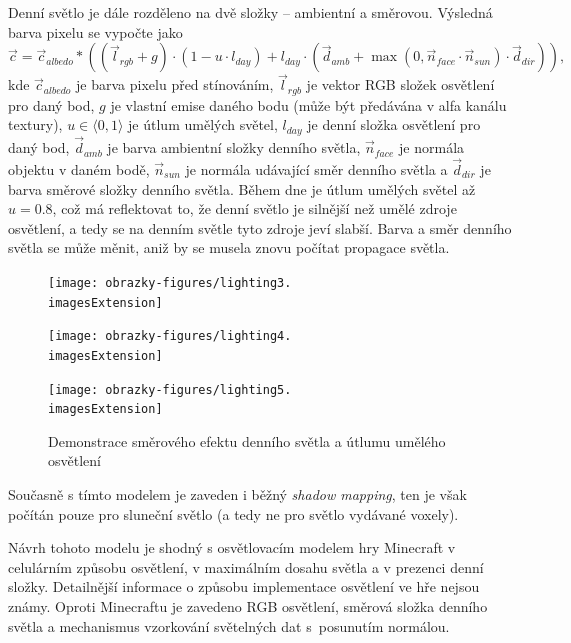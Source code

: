 Denní světlo je dále rozděleno na dvě složky -- ambientní a směrovou. Výsledná barva pixelu se vypočte jako
\begin{equation} \label{lightingEq}
	\vec{c} = \vec{c}_{albedo} * \left((\vec{l}_{rgb} + g) \cdot (1 - u \cdot l_{day}) + l_{day} \cdot \left(\vec{d}_{amb} + \max(0, \vec{n}_{face} \cdot \vec{n}_{sun}) \cdot \vec{d}_{dir}\right)\right) \text{,}
\end{equation}
kde $\vec{c}_{albedo}$ je barva pixelu před stínováním, $\vec{l}_{rgb}$ je vektor RGB složek osvětlení pro daný bod, $g$ je vlastní emise daného bodu (může být předávána v alfa kanálu textury), $u \in \langle 0,1 \rangle$ je útlum umělých světel, $l_{day}$ je denní složka osvětlení pro daný bod, $\vec{d}_{amb}$ je barva ambientní složky denního světla, $\vec{n}_{face}$ je normála objektu v daném bodě, $\vec{n}_{sun}$ je normála udávající směr denního světla a $\vec{d}_{dir}$ je barva směrové složky denního světla. Během dne je útlum umělých světel až $u = 0.8$, což má reflektovat to, že denní světlo je silnější než umělé zdroje osvětlení, a tedy se na denním světle tyto zdroje jeví slabší. Barva a směr denního světla se může měnit, aniž by se musela znovu počítat propagace světla.

\begin{figure}[H]
	\centering
	\begin{minipage}[t]{0.32\textwidth}
		\texttt{[image: obrazky-figures/lighting3.\\imagesExtension]}
	\end{minipage}
	\hfill
	\begin{minipage}[t]{0.32\textwidth}
		\texttt{[image: obrazky-figures/lighting4.\\imagesExtension]}
	\end{minipage}
	\hfill
	\begin{minipage}[t]{0.32\textwidth}
		\texttt{[image: obrazky-figures/lighting5.\\imagesExtension]}
	\end{minipage}
	\caption{Demonstrace směrového efektu denního světla a útlumu umělého osvětlení}
\end{figure}

Současně s tímto modelem je zaveden i běžný \textit{shadow mapping}, ten je však počítán pouze pro sluneční světlo (a tedy ne pro světlo vydávané voxely).

Návrh tohoto modelu je shodný s osvětlovacím modelem hry Minecraft v celulárním způsobu osvětlení, v maximálním dosahu světla a v prezenci denní složky. Detailnější informace o způsobu implementace osvětlení ve hře nejsou známy. Oproti Minecraftu je zavedeno RGB osvětlení, směrová složka denního světla a mechanismus vzorkování světelných dat s~posunutím normálou.

